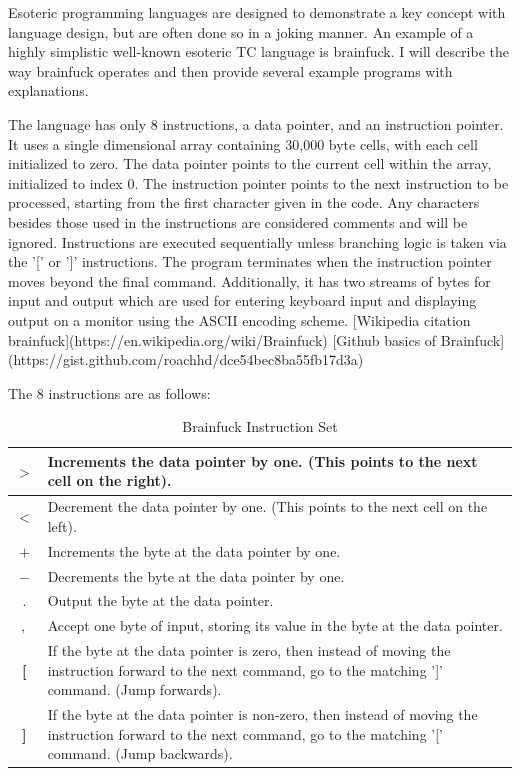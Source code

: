 Esoteric programming languages are designed to demonstrate a key concept with language design, but are often done so in a joking manner.
An example of a highly simplistic well-known esoteric TC language is brainfuck.
I will describe the way brainfuck operates and then provide several example programs with explanations.

The language has only 8 instructions, a data pointer, and an instruction pointer.
It uses a single dimensional array containing 30,000 byte cells, with each cell initialized to zero.
The data pointer points to the current cell within the array, initialized to index 0.
The instruction pointer points to the next instruction to be processed, starting from the first character given in the code.
Any characters besides those used in the instructions are considered comments and will be ignored.
Instructions are executed sequentially unless branching logic is taken via the '[' or ']' instructions.
The program terminates when the instruction pointer moves beyond the final command.
Additionally, it has two streams of bytes for input and output which are used for entering keyboard input and displaying output on a monitor using the ASCII encoding scheme.
[Wikipedia citation brainfuck](https://en.wikipedia.org/wiki/Brainfuck)
[Github basics of Brainfuck](https://gist.github.com/roachhd/dce54bec8ba55fb17d3a)

The 8 instructions are as follows:
\begin{table}[h!tb]
    \centering
    \begin{tabular}{|c|p{10cm}|}
        \hline
        \textbf{$>$} & Increments the data pointer by one. (This points to the next cell on the right). \\
        \hline
        \textbf{$<$} & Decrement the data pointer by one. (This points to the next cell on the left). \\
        \hline
        \textbf{$+$} & Increments the byte at the data pointer by one. \\
        \hline
        \textbf{$-$} & Decrements the byte at the data pointer by one. \\
        \hline
        \textbf{$.$} & Output the byte at the data pointer. \\
        \hline
        \textbf{$,$} & Accept one byte of input, storing its value in the byte at the data pointer.\\
        \hline
        \textbf{[} & If the byte at the data pointer is zero, then instead of moving the instruction forward to the next command, go to the matching ']' command. (Jump forwards). \\
        \hline
        \textbf{]} & If the byte at the data pointer is non-zero, then instead of moving the instruction forward to the next command, go to the matching '[' command. (Jump backwards). \\
        \hline
    \end{tabular}
    \caption{Brainfuck Instruction Set}
    \label{tab:BrainfuckInstructionSet}
\end{table}

